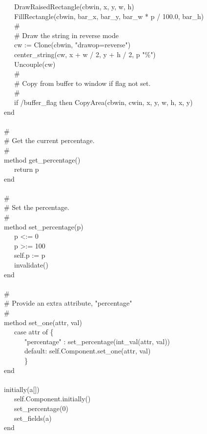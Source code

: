 {\>   \ \ \ DrawRaisedRectangle(cbwin, x, y, w,
h) \\
\>   \ \ \ FillRectangle(cbwin, bar\_x, bar\_y, bar\_w * p / 100.0, bar\_h) \\
\>   \ \ \ \# \\
\>   \ \ \ \# Draw the string in reverse mode \\
\>   \ \ \ cw := Clone(cbwin, "drawop=reverse") \\
\>   \ \ \ center\_string(cw, x + w / 2, y + h / 2,
p {\textbar}{\textbar} "\%") \\
\>   \ \ \ Uncouple(cw) \\
\>   \ \ \ \# \\
\>   \ \ \ \# Copy from buffer to window if flag not set. \\
\>   \ \ \ \# \\
\>   \ \ \ if /buffer\_flag then CopyArea(cbwin, cwin, x, y, w, h, x, y) \\
\>   end \\
\ \\
\>   \# \\
\>   \# Get the current percentage. \\
\>   \# \\
\>   method get\_percentage() \\
\>   \ \ \ return p \\
\>   end \\
\ \\
\>   \# \\
\>   \# Set the percentage. \\
\>   \# \\
\>   method set\_percentage(p) \\
\>   \ \ \ p {\textless}:= 0 \\
\>   \ \ \ p {\textgreater}:= 100 \\
\>   \ \ \ self.p := p \\
\>   \ \ \ invalidate() \\
\>   end \\
\ \\
\>   \# \\
\>   \# Provide an extra attribute, "percentage" \\
\>   \# \\
\>   method set\_one(attr, val) \\
\>   \ \ \ case attr of \{ \\
\>   \ \ \ \ \ \ "percentage" : set\_percentage(int\_val(attr, val)) \\
\>   \ \ \ \ \ \ default: self.Component.set\_one(attr, val) \\
\>   \ \ \ \ \ \ \} \\
\>   end \\
\ \\
\>   initially(a[]) \\
\>   \ \ \ self.Component.initially() \\
\>   \ \ \ set\_percentage(0) \\
\>   \ \ \ set\_fields(a) \\
end \\
}

